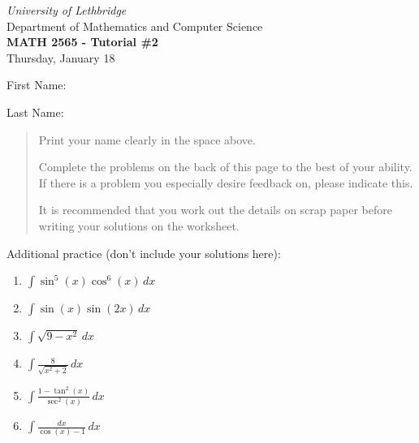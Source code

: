 \documentclass[12pt]{article}
\newcommand{\skipline}{\vspace{12pt}}
\newcommand{\di}{\displaystyle}
\begin{document}
\author{Instructor: Sean Fitzpatrick}
\thispagestyle{empty}
\begin{center}
\emph{University of Lethbridge}\\
Department of Mathematics and Computer Science\\
{\bf MATH 2565 - Tutorial \#2}\\
Thursday, January 18
\end{center}
\skipline \skipline \skipline \noindent \skipline

\skipline
First Name:\underline{\hspace{348pt}}\\
\skipline

\vspace{1cm}

Last Name:\underline{\hspace{351pt}}



\vspace{1cm}

\begin{quote}
Print your name clearly in the space above. 

\medskip

Complete the problems on the back of this page to the best of your ability. If there is a problem you especially desire feedback on, please indicate this. 

\medskip

It is recommended that you work out the details on scrap paper before writing your solutions on the worksheet.
\end{quote}

\vspace{2cm}


Additional practice (don't include your solutions here):
\begin{multicols}{2}
\begin{enumerate}
  \item $\di \int \sin^5(x)\cos^6(x)\,dx$

 \item $\di \int \sin(x)\sin(2x)\,dx$

  \item $\di \int \sqrt{9-x^2}\,dx$

 \item $\di \int \frac{8}{\sqrt{x^2+2}}\,dx$

 \item $\di \int \frac{1-\tan^2(x)}{\sec^2(x)}\,dx$
 
 \item $\di \int \frac{dx}{\cos(x)-1}\,dx$
\end{enumerate}  
\end{multicols}
\end{document}
